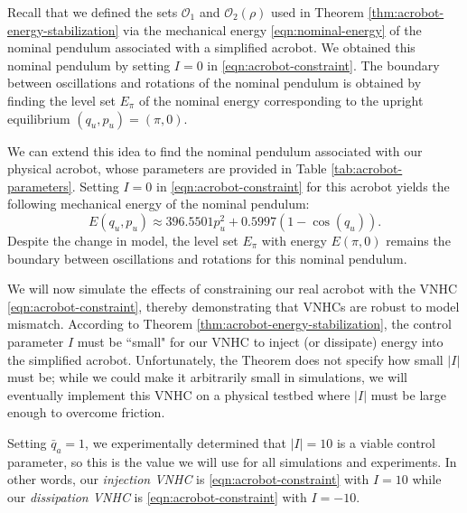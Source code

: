 \documentclass[journal,twoside,web, onecolumn, draftcls]{ieeecolor}
\begin{document}
Recall that we defined the sets \(\mathcal{O}_1\) and
\(\mathcal{O}_2(\rho)\) used in Theorem \ref{thm:acrobot-energy-stabilization}
via the mechanical energy \eqref{eqn:nominal-energy} of the nominal
pendulum associated with a simplified acrobot.
We obtained this nominal pendulum by setting \(I = 0\) in
\eqref{eqn:acrobot-constraint}.
The boundary between oscillations and rotations of the nominal
pendulum is obtained by finding the level set \(E_\pi\) of the nominal energy
corresponding to the upright equilibrium \((q_u,p_u) = (\pi,0)\).

We can extend this idea to find the nominal pendulum associated with our
physical acrobot, whose parameters are provided in Table
\ref{tab:acrobot-parameters}.
Setting \(I = 0\) in \eqref{eqn:acrobot-constraint} for this acrobot
yields the following mechanical energy of the nominal pendulum:
\[
    E(q_u,p_u) \approx 396.5501 p_u^2 + 0.5997(1 - \cos(q_u))
    .
\]
Despite the change in model, the level set \(E_\pi\) with energy 
\(E(\pi,0)\) remains the boundary between oscillations and rotations
for this nominal pendulum.

We will now simulate the effects of constraining our real acrobot with the VNHC
\eqref{eqn:acrobot-constraint}, thereby demonstrating that VNHCs are robust to
model mismatch.
According to Theorem \ref{thm:acrobot-energy-stabilization}, the control
parameter \(I\) must be ``small" for our VNHC to inject (or dissipate) energy
into the simplified acrobot. 
Unfortunately, the Theorem does not specify how small \(|I|\) must be;
while we could make it arbitrarily small in simulations, we will eventually
implement this VNHC on a physical testbed where \(|I|\) must be large enough to
overcome friction.

Setting \(\bar{q}_a = 1\), we experimentally determined that \(|I| = 10\) is a
viable control parameter, so this is the value we will use for all simulations
and experiments.
In other words, our \textit{injection VNHC} is \eqref{eqn:acrobot-constraint} with 
\(I = 10\) while our \textit{dissipation VNHC} is \eqref{eqn:acrobot-constraint} with 
\(I = -10\).

\begin{table}
    \centering
    \caption{Physical parameters for the real acrobot.}
    \label{tab:acrobot-parameters}
\end{table}
\end{document}

